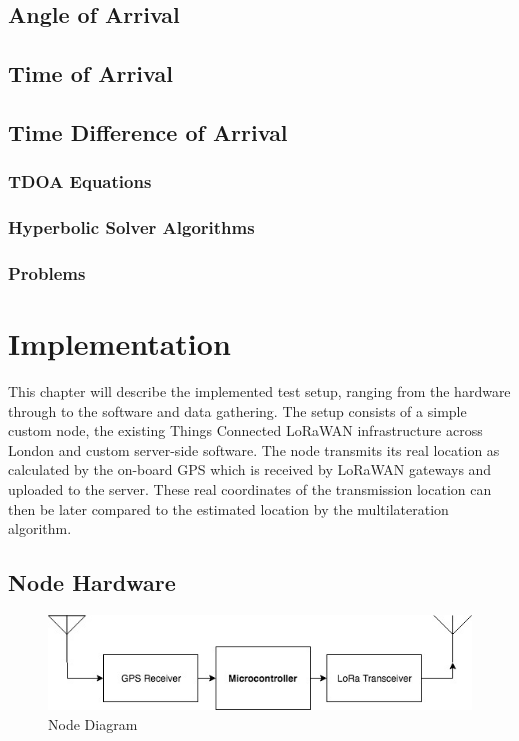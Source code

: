 \documentclass[a4paper]{report}
\begin{document}
  \section{Angle of Arrival}

  \section{Time of Arrival}

  \section{Time Difference of Arrival}
    \subsection{TDOA Equations}
    \subsection{Hyperbolic Solver Algorithms}
    \subsection{Problems}

\chapter{Implementation}

  This chapter will describe the implemented test setup, ranging from the hardware through to the software and data gathering. The setup consists of a simple custom node, the existing Things Connected LoRaWAN infrastructure across London and custom server-side software. The node transmits its real location as calculated by the on-board GPS which is received by LoRaWAN gateways and uploaded to the server. These real coordinates of the transmission location can then be later compared to the estimated location by the multilateration algorithm.


  \section{Node Hardware}

    \begin{figure}
    \centering
    \includegraphics[width=12cm]{figures/node.jpeg}
    \caption{Node Diagram}
    \label{fig:node}
    \end{figure}
\end{document}
